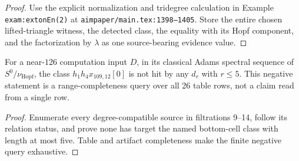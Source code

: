 \begin{proof}
  Use the explicit normalization and tridegree calculation in Example
  \texttt{exam:extonEn(2)} at \texttt{aimpaper/main.tex:1398--1405}.  Store
  the entire chosen lifted-triangle witness, the detected class, the equality
  with its Hopf component, and the factorization by $\lambda$ as one
  source-bearing evidence value.
\end{proof}

\begin{proposition}
  \label{evidence:cnu126-short-incoming-exclusion}
  \notready
  For a near-$126$ computation input $D$, in its classical Adams spectral
  sequence of $S^0/\nu_{\mathrm{Hopf}}$, the class
  $h_1h_4x_{109,12}[0]$ is not hit by any $d_r$ with $r\le5$.  This negative
  statement is a range-completeness query over all 26 table rows, not a claim
  read from a single row.
\end{proposition}

\begin{proof}
  Enumerate every degree-compatible source in filtrations 9--14, follow its
  relation status, and prove none has target the named bottom-cell class with
  length at most five.  Table and artifact completeness make the finite
  negative query exhaustive.
\end{proof}
